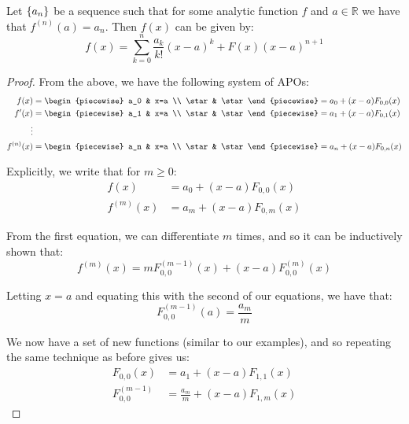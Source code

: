 \begin{theorem}
    \label{theorem:taylor_polynomial}
    Let $\{a_n\}$ be a sequence such that for some analytic function $f$ and $a\in\mathbb{R}$ we have that $f^{(n)}(a)=a_n$. Then $f(x)$ can be given by:
    $$
        f(x) = \sum_{k=0}^{n}{\frac{a_k}{k!}(x-a)^k}+F(x)(x-a)^{n+1}
    $$

    \begin{proof}
        From the above, we have the following system of APOs:
        \begin{align*}
            f(x) &= \begin{piecewise}
                a_0 & x=a \\
                \star & \star
            \end{piecewise} = a_0 + (x-a)F_{0,0}(x) \\
            f'(x) &= \begin{piecewise}
                a_1 & x=a \\
                \star & \star
            \end{piecewise} = a_1 + (x-a)F_{0,1}(x) \\
            \vdots \\
            f^{(n)}(x) &= \begin{piecewise}
                a_n & x=a \\
                \star & \star
            \end{piecewise} = a_n + (x-a)F_{0,n}(x) \\
        \end{align*}

        Explicitly, we write that for $m\geq 0$:
        \begin{align*}
            f(x) &= a_0 + (x-a)F_{0,0}(x) \\
            f^{(m)}(x) &= a_m + (x-a)F_{0,m}(x)
        \end{align*}

        From the first equation, we can differentiate $m$ times, and so it can be inductively shown that:
        $$
            f^{(m)}(x) = mF^{(m-1)}_{0,0}(x)+(x-a)F^{(m)}_{0,0}(x)
        $$

        Letting $x=a$ and equating this with the second of our equations, we have that:
        $$
            F^{(m-1)}_{0,0}(a)=\frac{a_m}{m}
        $$

        We now have a set of new functions (similar to our examples), and so repeating the same technique as before gives us:
        \begin{align*}
            F_{0,0}(x) &= a_1 + (x-a)F_{1,1}(x) \\
            F^{(m-1)}_{0,0} &= \frac{a_m}{m} + (x-a)F_{1,m}(x)
        \end{align*}


\end{proof}
\end{theorem}
